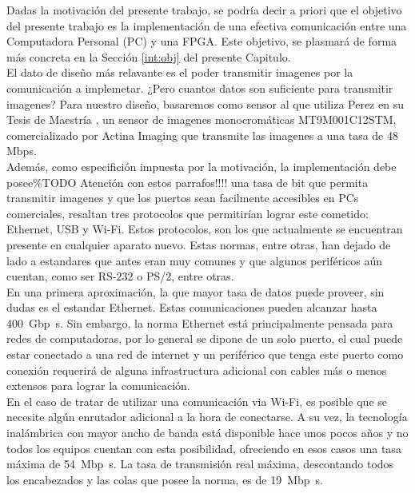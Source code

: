 Dadas la motivación del presente trabajo, se podría decir a priori que el objetivo del presente trabajo es la implementación de una efectiva comunicación entre una Computadora Personal (PC) y una FPGA. Este objetivo, se plasmará de forma más concreta en la Sección \ref{int:obj} del presente Capitulo.\\

El dato de diseño más relavante es el poder transmitir imagenes por la comunicación a implemetar. ¿Pero cuantos datos son suficiente para transmitir imagenes? Para nuestro diseño, basaremos como sensor al que utiliza Perez en su Tesis de Maestría \cite{Perez2018}, un sensor de imagenes monocromáticas MT9M001C12STM, comercializado por Actina Imaging \cite{Micron Technology2014} que transmite las imagenes a una tasa de 48 Mbps.\\

Además, como especifición impuesta por la motivación, la implementación debe posee\%TODO Atención con estos parrafos!!!!
 una tasa de bit que permita transmitir imagenes y que los puertos sean facilmente accesibles en PCs comerciales, resaltan tres protocolos que permitirían lograr este cometido: Ethernet, USB y Wi-Fi. Estos protocolos, son los que actualmente se encuentran presente en cualquier aparato nuevo. Estas normas, entre otras, han dejado de lado a estandares que antes eran muy comunes y que algunos periféricos aún cuentan, como ser RS-232 o PS/2, entre otras.\\ 

En una primera aproximación, la que mayor tasa de datos puede proveer, sin dudas es el estandar Ethernet. Estas comunicaciones pueden alcanzar hasta \SI{400}{\giga bp\second}. Sin embargo, la norma Ethernet está principalmente pensada para redes de computadoras, por lo general se dipone de un solo puerto, el cual puede estar conectado a una red de internet y un periférico que tenga este puerto como conexión requerirá de alguna infrastructura adicional con cables más o menos extensos para lograr la comunicación.\\

En el caso de tratar de utilizar una comunicación via Wi-Fi, es posible que se necesite algún enrutador adicional a la hora de conectarse. A su vez, la tecnología inalámbrica con mayor ancho de banda está disponible hace unos pocos años y no todos los equipos cuentan con esta posibilidad, ofreciendo en esos casos una tasa máxima de \SI{54}{\mega bp \second}. La tasa de transmisión real máxima, descontando todos los encabezados y las colas que posee la norma, es de \SI{19}{\mega bp\second}.
